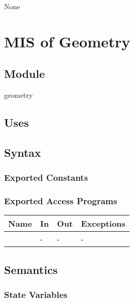 \documentclass[12pt, titlepage]{article}
\begin{document}
None

\newpage




\section{MIS of Geometry} \label{section-geometry}



\subsection{Module}

geometry

\subsection{Uses}


\subsection{Syntax}

\subsubsection{Exported Constants}

\subsubsection{Exported Access Programs}

\begin{center}
	\begin{tabular}{p{2cm} p{4cm} p{4cm} p{2cm}}
		\hline
		\textbf{Name} & \textbf{In} & \textbf{Out} & \textbf{Exceptions} \\
		\hline
		\wss{accessProg} & - & - & - \\
		\hline
	\end{tabular}
\end{center}

\subsection{Semantics}

\subsubsection{State Variables}
\end{document}
